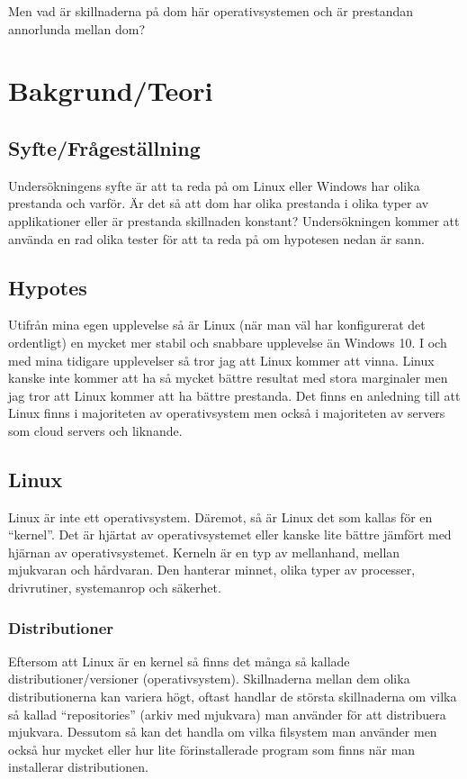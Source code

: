 \documentclass[12pt, a4paper]{report}
\begin{document}
    Men vad är skillnaderna på dom här operativsystemen och är prestandan annorlunda mellan dom?
    
\section{Bakgrund/Teori}


    \subsection{Syfte/Frågeställning}
    Undersökningens syfte är att ta reda på om Linux eller Windows har olika prestanda och varför. Är det så att dom har olika prestanda i olika typer av applikationer eller är prestanda skillnaden konstant? Undersökningen kommer att använda en rad olika tester för att ta reda på om hypotesen nedan är sann.
 

    \subsection{Hypotes}

    Utifrån mina egen upplevelse så är Linux (när man väl har konfigurerat det ordentligt) en mycket mer stabil och snabbare upplevelse än Windows 10. I och med mina tidigare upplevelser så tror jag att Linux kommer att vinna. Linux kanske inte kommer att ha så mycket bättre resultat med stora marginaler men jag tror att Linux kommer att ha bättre prestanda.
    Det finns en anledning till att Linux finns i majoriteten av operativsystem men också i majoriteten av servers som cloud servers och liknande.
 

    \subsection{Linux}
 
   Linux är inte ett operativsystem. Däremot, så är Linux det som kallas för en ``kernel''\cite{redhat}. Det är hjärtat av operativsystemet eller kanske lite bättre jämfört med hjärnan av operativsystemet. Kerneln är en typ av mellanhand, mellan mjukvaran och hårdvaran. Den hanterar minnet, olika typer av processer, drivrutiner, systemanrop och säkerhet\cite{redhat}.
 

    \subsubsection{Distributioner}

   Eftersom att Linux är en kernel så finns det många så kallade distributioner/versioner (operativsystem). Skillnaderna mellan dem olika distributionerna kan variera högt, oftast handlar de största skillnaderna om vilka så kallad ``repositories'' (arkiv med mjukvara) man använder för att distribuera mjukvara. Dessutom så kan det handla om vilka filsystem man använder men också hur mycket eller hur lite förinstallerade program som finns när man installerar distributionen.
\end{document}
